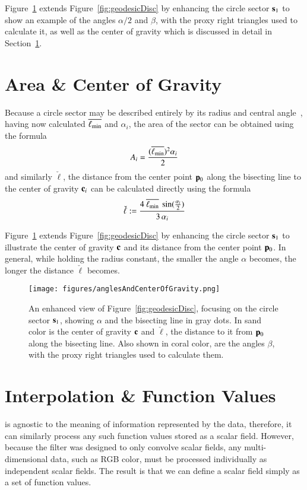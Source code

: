 Figure~\ref{fig:anglesAndCenterOfGravity} extends Figure~\ref{fig:geodesicDisc} by enhancing the circle sector $\mathbf{s}_1$ to show an example of the angles $\alpha/2$ and $\beta$, with the proxy right triangles used to calculate it, as well as the center of gravity which is discussed in detail in Section~\ref{ch4sACG}.

%
%
%
%
\section{Area \& Center of Gravity}
\label{ch4sACG}
Because a circle sector may be described entirely by its radius and central angle~\cite{Weisstein19d}, having now calculated $\overline{\ell_\text{min}}$ and $\alpha_i$, the area of the sector can be obtained using the formula
%
\begin{equation}
	A_i = \frac{(\overline{\ell_\text{min}})^2\alpha_i}{2}
	\label{eq:circularSectorArea}
\end{equation}
%
and similarly $\check{\ell}$, the distance from the center point $\mathbf{p}_0$ along the bisecting line to the center of gravity $\mathbf{c}_i$ can be calculated directly using the formula
%
\begin{equation}
	\check{\ell} := \frac{4\:\overline{\ell_\text{min}}\:\sin(\frac{\alpha_i}{2})}{3\,\alpha_i}
	\label{eq:distToCoG}
\end{equation}%

Figure~\ref{fig:anglesAndCenterOfGravity} extends Figure~\ref{fig:geodesicDisc} by enhancing the circle sector $\mathbf{s}_1$ to illustrate the center of gravity $\mathbf{c}$ and its distance from the center point $\mathbf{p}_0$. In general, while holding the radius constant, the smaller the angle $\alpha$ becomes, the longer the distance $\check{\ell}$ becomes.

\begin{figure}[ht]
\ffigbox
	{\texttt{[image: figures/anglesAndCenterOfGravity.png]}}
	{\caption[Angles and Center of Gravity]{An enhanced view of Figure~\ref{fig:geodesicDisc}, focusing on the circle sector $\mathbf{s}_1$, showing $\alpha$ and the bisecting line in gray dots. In sand color is the center of gravity $\mathbf{c}$ and $\check{\ell}$, the distance to it from $\mathbf{p}_0$ along the bisecting line. Also shown in coral color, are the angles $\beta$, with the proxy right triangles used to calculate them.}\label{fig:anglesAndCenterOfGravity}}
\end{figure}%

%
%
%
%
%
\section{Interpolation \& Function Values}
\label{ch4sIFV}
%
 is agnostic to the meaning of information represented by the data, therefore, it can similarly process any such function values stored as a scalar field. However, because the filter was designed to only convolve scalar fields, any multi-dimensional data, such as RGB color, must be processed individually as independent scalar fields. The result is that we can define a scalar field simply as a set of function values.

